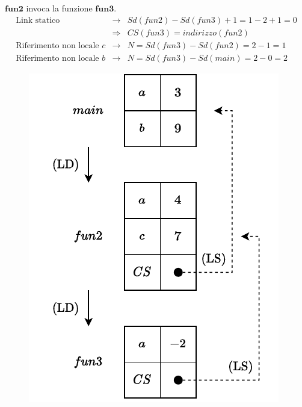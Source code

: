 \documentclass[a4paper]{article}
\begin{document}
	$\mathbf{fun2}$ invoca la funzione $\mathbf{fun3}$.
	\begin{equation*}
		\begin{array}{rcl}
			\text{Link statico} &\rightarrow& Sd(fun2) - Sd(fun3) + 1 = 1 - 2 + 1 = 0 \\ [.3em]
			&\Rightarrow& CS(fun3) = indirizzo(fun2) \\ [.3em]
			\text{Riferimento non locale }c &\rightarrow& N = Sd(fun3) - Sd(fun2) = 2 - 1 = 1 \\ [.3em]
			\text{Riferimento non locale }b &\rightarrow& N = Sd(fun3) - Sd(main) = 2 - 0 = 2
		\end{array}
	\end{equation*}
	\begin{figure}[!htp]
		\centering
		\includegraphics[width=.6\textwidth]{img/ex3-016.pdf}
	\end{figure}\newpage
	
\end{document}
